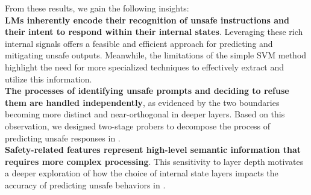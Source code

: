 
From these results, we gain the following insights:\\
\textbullet \hspace{3pt} \textbf{LMs inherently encode their recognition of unsafe instructions and their intent to respond within their internal states}. Leveraging these rich internal signals offers a feasible and efficient approach for predicting and mitigating unsafe outputs. Meanwhile, the limitations of the simple SVM method highlight the need for more specialized techniques to effectively extract and utilize this information.\\
\textbullet \hspace{3pt} \textbf{The processes of identifying unsafe prompts and deciding to refuse them are handled independently}, as evidenced by the two boundaries becoming more distinct and near-orthogonal in deeper layers. Based on this observation, we designed two-stage probers to decompose the process of predicting unsafe responses in .\\
\textbullet \hspace{3pt} \textbf{Safety-related features represent high-level semantic information that requires more complex processing}. This sensitivity to layer depth motivates a deeper exploration of how the choice of internal state layers impacts the accuracy of predicting unsafe behaviors in .

